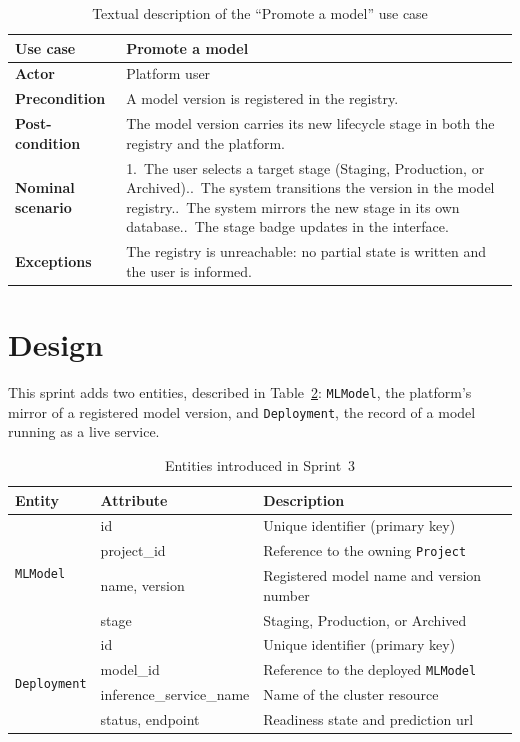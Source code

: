 \begin{table}[H]\centering
\renewcommand{\arraystretch}{1.3}
\caption{Textual description of the ``Promote a model'' use case}\label{tab:uc-promote}
\begin{tabularx}{\textwidth}{|>{\bfseries}p{3.2cm}|X|}
\hline
Use case & Promote a model\\ \hline
Actor & Platform user\\ \hline
Precondition & A model version is registered in the registry.\\ \hline
Post-condition & The model version carries its new lifecycle stage in both the registry and the platform.\\ \hline
Nominal scenario & 1.~The user selects a target stage (Staging, Production, or Archived).\newline 2.~The system transitions the version in the model registry.\newline 3.~The system mirrors the new stage in its own database.\newline 4.~The stage badge updates in the interface.\\ \hline
Exceptions & The registry is unreachable: no partial state is written and the user is informed.\\ \hline
\end{tabularx}
\end{table}

\section{Design}
This sprint adds two entities, described in Table~\ref{tab:entities-s3}:
\texttt{MLModel}, the platform's mirror of a registered model version, and
\texttt{Deployment}, the record of a model running as a live service.

\begin{table}[H]\centering
\renewcommand{\arraystretch}{1.25}
\caption{Entities introduced in Sprint~3}\label{tab:entities-s3}
\begin{tabularx}{\textwidth}{|l|l|X|}
\hline
\textbf{Entity} & \textbf{Attribute} & \textbf{Description}\\
\hline
\multirow{4}{*}{\texttt{MLModel}}
 & id & Unique identifier (primary key)\\ \cline{2-3}
 & project\_id & Reference to the owning \texttt{Project}\\ \cline{2-3}
 & name, version & Registered model name and version number\\ \cline{2-3}
 & stage & Staging, Production, or Archived\\
\hline
\multirow{4}{*}{\texttt{Deployment}}
 & id & Unique identifier (primary key)\\ \cline{2-3}
 & model\_id & Reference to the deployed \texttt{MLModel}\\ \cline{2-3}
 & inference\_service\_name & Name of the cluster resource\\ \cline{2-3}
 & status, endpoint & Readiness state and prediction \gls{url}\\
\hline
\end{tabularx}
\end{table}

